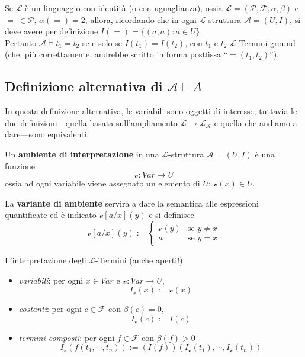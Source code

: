 \begin{oss}
Se $\mathscr{L}$ è un linguaggio con identità (o con uguaglianza), ossia $\mathscr{L} = (\mathscr{P}, \mathscr{F}, \alpha, \beta)$ e $=\ \in \mathscr{P}$, $\alpha(=) = 2$, allora, ricordando che in ogni $\mathscr{L}$-struttura $\mathscr{A} = (U,I)$, si deve avere per definizione $I(=) = \{(a,a) : a \in U\}$. \\
Pertanto $\mathscr{A} \models t_1 = t_2$ se e solo se $I(t_1) = I(t_2)$, con $t_1$ e $t_2$ $\mathscr{L}$-Termini ground (che, più correttamente, andrebbe scritto in forma postfissa ``$=(t_1, t_2)$'').
\end{oss}

\subsection{Definizione alternativa di $\mathscr{A} \models A$} 
In questa definizione alternativa,  le variabili sono oggetti di interesse; tuttavia le due definizioni—quella basata sull'ampliamento $\mathscr{L} \rightarrow \mathscr{L}_{\mathscr{A}}$ e quella che andiamo a dare—sono equivalenti. 
\begin{defi}[Ambiente]
Un \textbf{ambiente di interpretazione} in una $\mathscr{L}$-struttura $\mathscr{A} = (U,I)$ è una funzione
$$
\mathcal{v} : Var \rightarrow U
$$
ossia ad ogni variabile viene assegnato un elemento di $U$: $\mathcal{v}(x) \in U$.
\end{defi}
\begin{defi}
La \textbf{variante di ambiente} servirà a dare la semantica alle espressioni quantificate ed è indicato $\mathcal{v}[a/x](y)$ e si definisce 
$$
\mathcal{v}[a/x](y) :=
\begin{cases}
  \mathcal{v}(y) & \text{se } y \neq x \\
  a & \text{se } y = x
\end{cases}
$$
\end{defi}
\begin{defi}
L'interpretazione degli $\mathscr{L}$-Termini (anche aperti!)
\begin{itemize}
  \item \textit{variabili}: per ogni $x \in Var$ e $\mathcal{v} : Var \rightarrow U$,
  $$
  I_{\mathcal{v}}(x) := \mathcal{v}(x)
  $$
  \item \textit{costanti}: per ogni $c \in \mathscr{F}$ con $\beta(c) = 0$,
  $$
  I_{\mathcal{v}}(c) := I(c)
  $$
  \item \textit{termini composti}: per ogni $f \in \mathscr{F}$ con $\beta(f) > 0$
  $$
  I_{\mathcal{v}}(f(t_1, \cdots, t_n)) := (I(f))(I_{\mathcal{v}}(t_1), \cdots, I_{\mathcal{v}}(t_n))
  $$
\end{itemize}
\end{defi}
